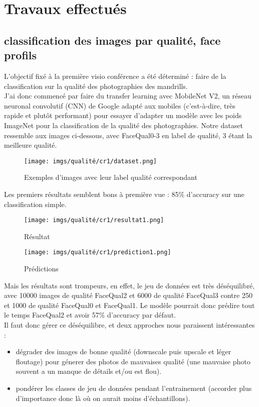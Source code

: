 \section{Travaux effectués} 

\subsection{\Gls{classification} des images par qualité, face profils}
L'objectif fixé à la première visio conférence a été déterminé : faire de la \gls{classification} sur la qualité des photographies des mandrills.\\

J'ai donc commencé par faire du \gls{transfer learning} avec MobileNet V2, un réseau neuronal convolutif (CNN)  de Google adapté aux mobiles (c'est-à-dire, très rapide et plutôt performant) pour essayer d'adapter un modèle avec les poids ImageNet pour la \gls{classification} de la qualité des photographies. Notre \gls{dataset} ressemble aux images ci-dessous, avec FaceQual0-3 en label de qualité, 3 étant la meilleure qualité.

\begin{figure}
    \centering
    \texttt{[image: imgs/qualité/cr1/dataset.png]}
    \caption{Exemples d'images avec leur label qualité correspondant}
    \label{fig:my_label}
\end{figure}

Les premiers résultats semblent bons à première vue : 85\% d'\gls{accuracy} sur une \gls{classification} simple.

\begin{figure}
    \centering
    \texttt{[image: imgs/qualité/cr1/resultat1.png]}
    \caption{Résultat}
    \label{fig:my_label}
\end{figure}

\begin{figure}
    \centering
    \texttt{[image: imgs/qualité/cr1/prediction1.png]}
    \caption{Prédictions}
    \label{fig:my_label}
\end{figure}

Mais les résultats sont trompeurs, en effet, le jeu de données est très déséquilibré, avec 10000 images de qualité FaceQual2 et 6000 de qualité FaceQual3 contre 250 et 1000 de qualité FaceQual0 et FaceQual1. Le modèle pourrait donc prédire tout le temps FaceQual2 et avoir 57\% d'\gls{accuracy} par défaut.\\

Il faut donc gérer ce déséquilibre, et deux approches nous paraissent intéressantes :\\
\begin{itemize}
    \item dégrader des images de bonne qualité (downscale puis upscale et léger floutage) pour génerer des photos de mauvaises qualité (une mauvaise photo souvent a un manque de détails et/ou est flou).
    \item pondérer les classes de jeu de données pendant l'entrainement (accorder plus d'importance donc là où on aurait moins d'échantillons).
\end{itemize}

